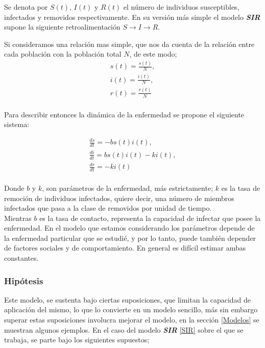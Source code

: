 \documentclass[journal]{IEEEtran}
\begin{document}
Se denota por $S(t)$, $I(t)$ y $R(t)$ el número de individuos susceptibles,
infectados y removidos respectivamente.
En su versión más simple el modelo \textbf{\textit{SIR}} supone la siguiente
retroalimentación $S \rightarrow I \rightarrow R$.\newline

Si consideramos una relación mas simple, que nos da cuenta de la relación entre
cada población con la población total $N$, de este modo;
\begin{equation} \label{poblaciones}
  \begin{split}
    s(t) = \frac{s(t)}{N},\\
    i(t) = \frac{i(t)}{N},\\
    r(t) = \frac{r(t)}{N}\\
  \end{split}
\end{equation}

Para describir entonces la dinámica de la enfermedad se propone el siguiente
sistema:

\begin{equation}\label{SIR}
  \begin{split}
    \frac{ds}{dt} = -bs(t)i(t),\\
    \frac{di}{dt} = bs(t)i(t)-ki(t),\\
    \frac{dr}{dt} = -ki(t)\\
  \end{split}
\end{equation}

Donde $b$ y $k$, son parámetros de la enfermedad, más estrictamente; $k$ es la
tasa de remoción de individuos infectados, quiere decir, una
número de miembros infectados que pasa a la clase de removidos por unidad de
tiempo.\\
Mientras $b$ es la tasa de contacto, representa la capacidad de infectar que
posee la enfermedad. En el modelo que estamos considerando los parámetros
depende de la enfermedad
particular que se estudié, y por lo tanto, puede también depender de factores
sociales y
de comportamiento. En general es difícil estimar ambas constantes.

\subsubsection{Hipótesis}
Este modelo, se sustenta bajo ciertas suposiciones, que limitan la capacidad de
aplicación del mismo, lo que lo convierte en un modelo sencillo,
más sin embargo superar estas suposiciones involucra mejorar el modelo, en la
sección \ref{Modelos} se muestran algunos ejemplos. En el caso del modelo
\textbf{\textit{SIR}} \ref{SIR}
sobre el que se trabaja, se parte bajo los siguientes supuestos;
\end{document}
